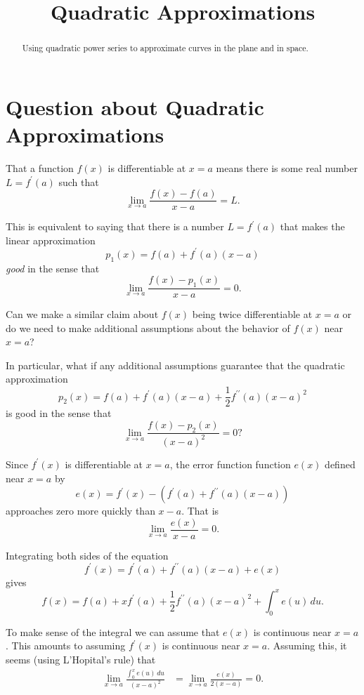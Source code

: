 \documentclass{ximera}
\title{Quadratic Approximations}
\begin{document}
\begin{abstract}
Using quadratic power series to approximate curves in the plane and in space.
\end{abstract}
\maketitle


\section{Question about Quadratic Approximations}

That a function $f(x)$ is differentiable at $x=a$ means there is some real number $L=f^\prime(a)$ such that
\[
   \lim_{x\to a} \frac{f(x)-f(a)}{x-a} = L.
\]

This is equivalent to saying that there is a number $L = f^\prime(a)$ that makes the linear approximation
\[
      p_1(x) = f(a) +f^\prime(a) (x-a)
\]
\emph{good} in the sense that 
\[
 \lim_{x\to a} \frac{f(x) - p_1(x)}{x-a} = 0 .
\]


Can we make a similar claim about $f(x)$ being twice differentiable at $x=a$ or do we need to make additional assumptions about the behavior of $f(x)$ near $x=a$?

In particular, what if any additional assumptions guarantee that the quadratic approximation
\[
    p_2(x) = f(a) + f^\prime(a) (x-a) + \frac{1}{2}f^{\prime\prime}(a)(x-a)^2
\]
is good in the sense that
\[
   \lim_{x\to a} \frac{f(x) - p_2(x)}{(x-a)^2} = 0 ?
\]

Since $f^\prime(x)$ is differentiable at $x=a$, the error function function $e(x)$ defined near $x=a$ by
\[
     e(x) = f^\prime(x) - ( f^\prime(a) + f^{\prime\prime}(a)(x-a)) 
\]
approaches zero more quickly than $x-a$. That is 
\[
     \lim_{x\to a} \frac{e(x)}{x-a} = 0.
\]

Integrating both sides of the equation
\[
    f^\prime(x) = f^\prime(a) + f^{\prime\prime}(a)(x-a) + e(x)
\]
gives
\[
  f(x) = f(a) + x f^\prime(a) + \frac{1}{2}f^{\prime\prime}(a)(x-a)^2 + \int_0^x e(u)\, du .
\]

To make sense of the integral we can assume that $e(x)$ is continuous near $x=a$. This amounts to assuming $f^\prime(x)$ is continuous near $x=a$. Assuming this, it seems (using L'Hopital's rule) that
\begin{align*}
         \lim_{x\to a} \frac{\int_0^x e(u)\, du}{(x-a)^2} &= \lim_{x\to a} \frac{e(x)}{2(x-a)} = 0.
\end{align*}
\end{document}
